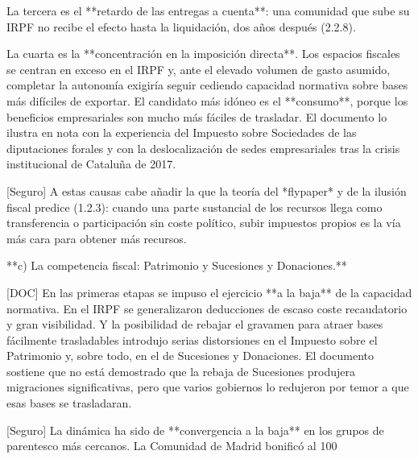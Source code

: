 \documentclass[10pt,a4paper]{article}
\begin{document}
La tercera es el **retardo de las entregas a cuenta**: una comunidad que sube su IRPF no recibe el efecto hasta la liquidación, dos años después (2.2.8).

La cuarta es la **concentración en la imposición directa**. Los espacios fiscales se centran en exceso en el IRPF y, ante el elevado volumen de gasto asumido, completar la autonomía exigiría seguir cediendo capacidad normativa sobre bases más difíciles de exportar. El candidato más idóneo es el **consumo**, porque los beneficios empresariales son mucho más fáciles de trasladar. El documento lo ilustra en nota con la experiencia del Impuesto sobre Sociedades de las diputaciones forales y con la deslocalización de sedes empresariales tras la crisis institucional de Cataluña de 2017.

[Seguro] A estas causas cabe añadir la que la teoría del *flypaper* y de la ilusión fiscal predice (1.2.3): cuando una parte sustancial de los recursos llega como transferencia o participación sin coste político, subir impuestos propios es la vía más cara para obtener más recursos.

**c) La competencia fiscal: Patrimonio y Sucesiones y Donaciones.**

[DOC] En las primeras etapas se impuso el ejercicio **a la baja** de la capacidad normativa. En el IRPF se generalizaron deducciones de escaso coste recaudatorio y gran visibilidad. Y la posibilidad de rebajar el gravamen para atraer bases fácilmente trasladables introdujo serias distorsiones en el Impuesto sobre el Patrimonio y, sobre todo, en el de Sucesiones y Donaciones. El documento sostiene que no está demostrado que la rebaja de Sucesiones produjera migraciones significativas, pero que varios gobiernos lo redujeron por temor a que esas bases se trasladaran.

[Seguro] La dinámica ha sido de **convergencia a la baja** en los grupos de parentesco más cercanos. La Comunidad de Madrid bonificó al 100%
\end{document}
